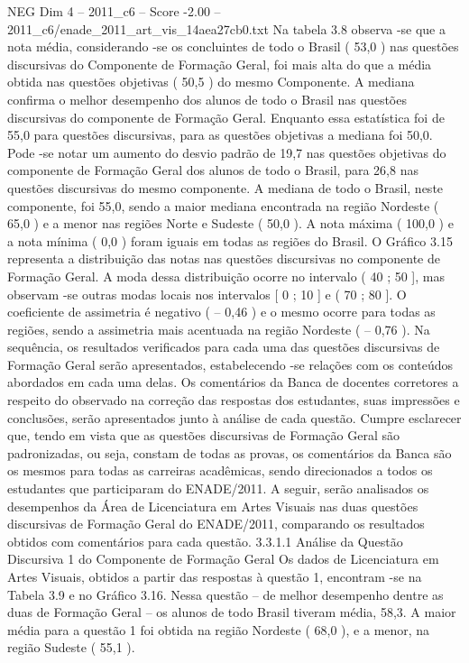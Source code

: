 \begin{textsample}{NEG Dim 4 – 2011\_c6 – Score -2.00 – 2011\_c6/enade\_2011\_art\_vis\_14aea27cb0.txt}
Na tabela 3.8 observa -se que a nota média, considerando -se os concluintes de todo o Brasil ( 53,0 ) nas questões discursivas do Componente de Formação Geral, foi mais alta do que a média obtida nas questões objetivas ( 50,5 ) do mesmo Componente.
A mediana confirma o melhor desempenho dos alunos de todo o Brasil nas questões discursivas do componente de Formação Geral.
Enquanto essa estatística foi de 55,0 para questões discursivas, para as questões objetivas a mediana foi 50,0.
Pode -se notar um aumento do desvio padrão de 19,7 nas questões objetivas do componente de Formação Geral dos alunos de todo o Brasil, para 26,8 nas questões discursivas do mesmo componente.
A mediana de todo o Brasil, neste componente, foi 55,0, sendo a maior mediana encontrada na região Nordeste ( 65,0 ) e a menor nas regiões Norte e Sudeste ( 50,0 ).
A nota máxima ( 100,0 ) e a nota mínima ( 0,0 ) foram iguais em todas as regiões do Brasil.
O Gráfico 3.15 representa a distribuição das notas nas questões discursivas no componente de Formação Geral.
A moda dessa distribuição ocorre no intervalo ( 40 ; 50 ], mas observam -se outras modas locais nos intervalos [ 0 ; 10 ] e ( 70 ; 80 ].
O coeficiente de assimetria é negativo ( – 0,46 ) e o mesmo ocorre para todas as regiões, sendo a assimetria mais acentuada na região Nordeste ( – 0,76 ).
Na sequência, os resultados verificados para cada uma das questões discursivas de Formação Geral serão apresentados, estabelecendo -se relações com os conteúdos abordados em cada uma delas.
Os comentários da Banca de docentes corretores a respeito do observado na correção das respostas dos estudantes, suas impressões e conclusões, serão apresentados junto à análise de cada questão.
Cumpre esclarecer que, tendo em vista que as questões discursivas de Formação Geral são padronizadas, ou seja, constam de todas as provas, os comentários da Banca são os mesmos para todas as carreiras acadêmicas, sendo direcionados a todos os estudantes que participaram do ENADE/2011.
A seguir, serão analisados os desempenhos da Área de Licenciatura em Artes Visuais nas duas questões discursivas de Formação Geral do ENADE/2011, comparando os resultados obtidos com comentários para cada questão. 3.3.1.1 Análise da Questão Discursiva 1 do Componente de Formação Geral Os dados de Licenciatura em Artes Visuais, obtidos a partir das respostas à questão 1, encontram -se na Tabela 3.9 e no Gráfico 3.16.
Nessa questão – de melhor desempenho dentre as duas de Formação Geral – os alunos de todo Brasil tiveram média, 58,3.
A maior média para a questão 1 foi obtida na região Nordeste ( 68,0 ), e a menor, na região Sudeste ( 55,1 ).

\end{textsample}
